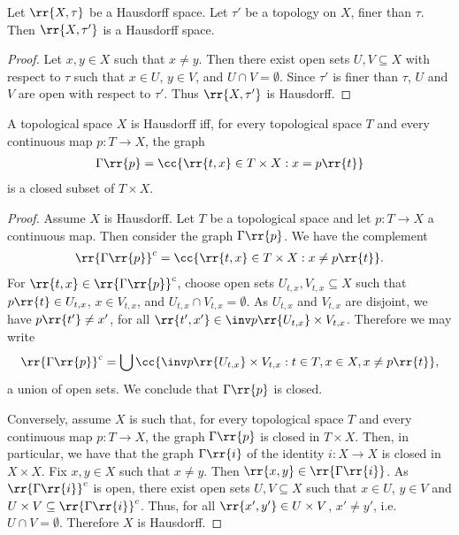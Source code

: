 \documentclass{article}
\begin{document}
\begin{claim*}
  Let $\rr{X,\tau}$ be a Hausdorff space. Let $\tau'$ be a topology on $X$, finer than $\tau$.
  Then $\rr{X,\tau'}$ is a Hausdorff space.
  \begin{proof}
    Let $x,y\in X$ such that $x\neq y$. Then there exist open sets $U,V\subseteq X$ with respect
    to $\tau$ such that $x\in U$, $y\in V$, and $U\cap V=\emptyset$. Since $\tau'$ is finer than
    $\tau$, $U$ and $V$ are open with respect to $\tau'$. Thus $\rr{X,\tau'}$ is Hausdorff.
  \end{proof}
\end{claim*}

\begin{claim*}
  A topological space $X$ is Hausdorff iff, for every topological space $T$ and every continuous
  map $p:T\to X$, the graph
  \begin{align*}
    \Gamma\rr{p}=\cc{\rr{t,x}\in T\times X:x=p\rr{t}}
  \end{align*}
  is a closed subset of $T\times X$.
  \begin{proof}
    Assume $X$ is Hausdorff. Let $T$ be a topological space and let $p:T\to X$ a continuous map.
    Then consider the graph $\Gamma\rr{p}$. We have the complement
    \begin{align*}
      \rr{\Gamma\rr{p}}^c=\cc{\rr{t,x}\in T\times X : x \neq p\rr{t}}.
    \end{align*}
    For $\rr{t,x}\in \rr{\Gamma\rr{p}}^c$, choose open sets $U_{t,x},V_{t,x}\subseteq X$
    such that $p\rr{t}\in U_{t,x}$, $x\in V_{t,x}$, and $U_{t,x}\cap V_{t,x}=\emptyset$.
    As $U_{t,x}$ and $V_{t,x}$ are disjoint, we have $p\rr{t'}\neq x'$, for all
    $\rr{t',x'}\in \inv p\rr{U_{t,x}}\times V_{t,x}$.
    Therefore we may write
    \begin{align*}
      \rr{\Gamma\rr{p}}^c=\bigcup \cc{\inv p\rr{U_{t,x}}\times V_{t,x} : t\in T, x\in X, x\neq p\rr{t}},
    \end{align*}
    a union of open sets. We conclude that $\Gamma\rr{p}$ is closed.

    Conversely, assume $X$ is such that, for every topological space $T$ and every continuous map
    $p:T\to X$, the graph $\Gamma\rr{p}$ is closed in $T\times X$. Then, in particular, we have
    that the graph $\Gamma\rr{i}$ of the identity $i:X\to X$ is closed in $X\times X$. Fix $x,y\in X$ such that
    $x\neq y$. Then $\rr{x,y}\in \rr{\Gamma\rr{i}}$. As $\rr{\Gamma\rr{i}}^c$ is open, there exist
    open sets $U,V\subseteq X$ such that $x\in U$, $y\in V$ and $U\times V\subseteq \rr{\Gamma\rr{i}}^c$.
    Thus, for all $\rr{x',y'}\in U\times V$, $x'\neq y'$, i.e. $U\cap V=\emptyset$. Therefore $X$ is Hausdorff.
  \end{proof}
\end{claim*}
\end{document}
